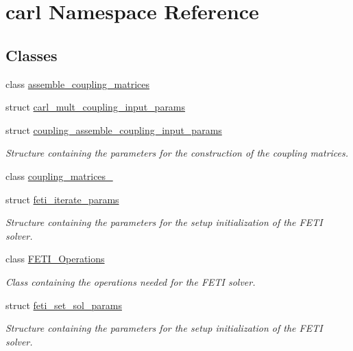 \hypertarget{namespacecarl}{}\section{carl Namespace Reference}
\label{namespacecarl}
\subsection*{Classes}
\begin{DoxyCompactItemize}
\item 
class \hyperlink{classcarl_1_1assemble__coupling__matrices}{assemble\+\_\+coupling\+\_\+matrices}
\item 
struct \hyperlink{structcarl_1_1carl__mult__coupling__input__params}{carl\+\_\+mult\+\_\+coupling\+\_\+input\+\_\+params}
\item 
struct \hyperlink{structcarl_1_1coupling__assemble__coupling__input__params}{coupling\+\_\+assemble\+\_\+coupling\+\_\+input\+\_\+params}
\begin{DoxyCompactList}\small\item\em Structure containing the parameters for the construction of the coupling matrices. \end{DoxyCompactList}\item 
class \hyperlink{classcarl_1_1coupling__matrices__3}{coupling\+\_\+matrices\+\_}
\item 
struct \hyperlink{structcarl_1_1feti__iterate__params}{feti\+\_\+iterate\+\_\+params}
\begin{DoxyCompactList}\small\item\em Structure containing the parameters for the setup initialization of the F\+E\+T\+I solver. \end{DoxyCompactList}\item 
class \hyperlink{classcarl_1_1_f_e_t_i___operations}{F\+E\+T\+I\+\_\+\+Operations}
\begin{DoxyCompactList}\small\item\em Class containing the operations needed for the F\+E\+T\+I solver. \end{DoxyCompactList}\item 
struct \hyperlink{structcarl_1_1feti__set__sol__params}{feti\+\_\+set\+\_\+sol\+\_\+params}
\begin{DoxyCompactList}\small\item\em Structure containing the parameters for the setup initialization of the F\+E\+T\+I solver. \end{DoxyCompactList}\item 

\end{DoxyCompactItemize}
